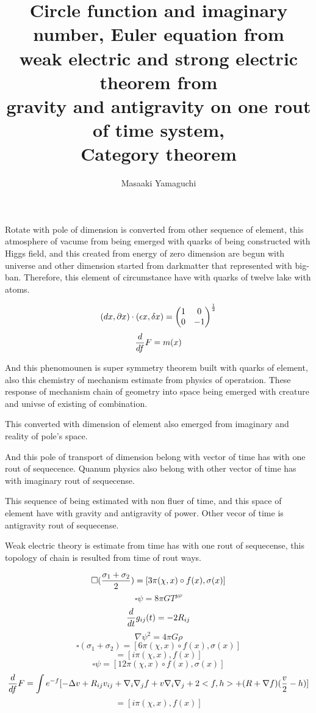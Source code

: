 \documentclass{jsarticle}
\begin{document}
\title{Circle function and imaginary number, Euler equation from \\
        weak electric and strong electric theorem from \\
	gravity and antigravity on one rout of time system, \\
	          Category theorem}
\author{Masaaki Yamaguchi}
\date{}
\maketitle

 Rotate with pole of dimension is converted from other sequence of element,  
this atmosphere of vacume from being emerged with quarks of being constructed
with Higgs field, and this created from energy of zero dimension are begun with
universe and other dimension started from darkmatter that represented with 
big-ban.
Therefore, this element of circumstance have with quarks of twelve lake with
atoms.

  $$ (dx, \partial x)\cdot (\epsilon x, \delta x) = \begin{pmatrix}
	  1 & 0 \\
  0 & - 1 \end{pmatrix}^{1 \over 2}  $$
  $$ {d \over df} F = m(x) $$

 And this phenomounen is super symmetry theorem built with quarks of element, 
also this chemistry of mechanism estimate from physics of operatsion.
These response of mechanism chain of geometry into space being emerged with
creature and univse of existing of combination.

  This converted with dimension of element also emerged from imaginary and 
reality of pole's space.

  And this pole of transport of dimension belong with vector of time has 
with one rout of sequecence. Quanum physics also belong with other vector 
of time has with imaginary rout of sequecense.

 This sequence of being estimated with non fluer of time, and this space 
of element have with gravity and antigravity of power.
Other vecor of time is antigravity rout of sequecense.

 Weak electric theory is estimate from time has with one rout of sequecense,
this topology of chain is resulted from time of rout ways.

      $$ \square ({{\sigma_1 + \sigma_2} \over 2 }) = [3 \pi (\chi,x) \circ f(x),
   \sigma(x)] $$
   $$ \square \psi = 8 \pi G T^{\mu\nu} $$
   $$ {d \over dt}g_{ij}(t) = - 2 R_{ij} $$
   $$ \nabla \psi^2 = 4 \pi G \rho $$
   $$ \square (\sigma_1 + \sigma_2) = [6\pi(\chi,x)\circ f(x), \sigma(x)] $$
   $$ = [i \pi(\chi,x),f(x)] $$
   $$ \square \psi = [12 \pi (\chi,x)\circ f(x), \sigma(x)] $$
   $$ {d \over df} F = \int e^{-f}[- \Delta v + R_{ij} v_{ij}+ 
   \nabla_i \nabla_j f  + v \nabla_i \nabla_j + 2<f,h> + (R + \nabla f)
   ({v \over 2} - h) ] $$
   $$ =[i \pi(\chi,x), f(x)] $$
\end{document}
